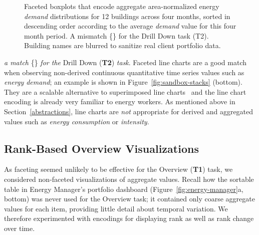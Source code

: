 \documentclass[journal]{vgtc}                %
\newcommand*\match{\textcolor{darkGreen}{\ding{52}}}
\newcommand*\mismatch{\textcolor{red}{\ding{54}}}
\newcommand{\bstart}[1]{\vspace{1mm} \noindent{\textbf{#1:}}}
\begin{document}
\begin{figure}[ht]
    \vspace{-0.3cm}
	\centering
	\vspace{-0.15cm}
	\caption{Faceted boxplots that encode aggregate area-normalized energy \textsl{demand} distributions for 12 buildings across four months, sorted in descending order according to the average \textsl{demand} value for this four month period. A mismatch  \{\mismatch\} for the Drill Down task (T2). Building names are blurred to sanitize real client portfolio data.}
	\label{fig:sandbox-faceted-boxplot}
	\vspace{-0.3cm}
\end{figure} 

\bstart{Faceted line charts} {\it a match} \{\match\} {\it for the} Drill Down ({\bf T2}) {\it task}.
Faceted line charts are a good match when observing non-derived continuous quantitative time series values such as {\it energy demand}; an example is shown in Figure~\ref{fig:sandbox-stacks} (bottom).
They are a scalable alternative to superimposed line charts~\cite{Javed2010} and the line chart encoding is already very familiar to energy workers.
As mentioned above in Section~\ref{abstractions}, line charts are {\it not} appropriate for derived and aggregated values such as {\it energy consumption} or {\it intensity}.


\subsection{Rank-Based Overview Visualizations}
\label{design-ranking}


As faceting seemed unlikely to be effective for the Overview ({\bf T1}) task, we considered non-faceted visualizations of aggregate values.
Recall how the sortable table in Energy Manager's portfolio dashboard (Figure~\ref{fig:energy-manager}a, bottom) was never used for the Overview task; it contained only coarse aggregate values for each item, providing little detail about temporal variation.
We therefore experimented with encodings for displaying rank as well as rank change over time.
\end{document}
